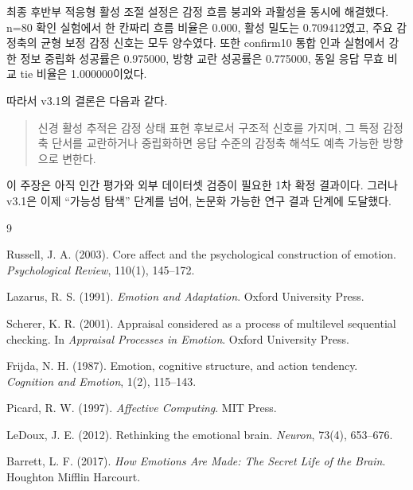 \documentclass[11pt,a4paper]{article}
\begin{document}
최종 후반부 적응형 활성 조절 설정은 감정 흐름 붕괴와 과활성을 동시에 해결했다. n=80 확인 실험에서 한 칸짜리 흐름 비율은 0.000, 활성 밀도는 0.709412였고, 주요 감정축의 균형 보정 감정 신호는 모두 양수였다. 또한 confirm10 통합 인과 실험에서 강한 정보 중립화 성공률은 0.975000, 방향 교란 성공률은 0.775000, 동일 응답 무효 비교 tie 비율은 1.000000이었다.

따라서 v3.1의 결론은 다음과 같다.

\begin{quote}
신경 활성 추적은 감정 상태 표현 후보로서 구조적 신호를 가지며, 그 특정 감정축 단서를 교란하거나 중립화하면 응답 수준의 감정축 해석도 예측 가능한 방향으로 변한다.
\end{quote}

이 주장은 아직 인간 평가와 외부 데이터셋 검증이 필요한 1차 확정 결과이다. 그러나 v3.1은 이제 ``가능성 탐색'' 단계를 넘어, 논문화 가능한 연구 결과 단계에 도달했다.

\begin{thebibliography}{9}

Russell, J. A. (2003).
Core affect and the psychological construction of emotion.
\textit{Psychological Review}, 110(1), 145--172.

Lazarus, R. S. (1991).
\textit{Emotion and Adaptation}.
Oxford University Press.

Scherer, K. R. (2001).
Appraisal considered as a process of multilevel sequential checking.
In \textit{Appraisal Processes in Emotion}.
Oxford University Press.

Frijda, N. H. (1987).
Emotion, cognitive structure, and action tendency.
\textit{Cognition and Emotion}, 1(2), 115--143.

Picard, R. W. (1997).
\textit{Affective Computing}.
MIT Press.

LeDoux, J. E. (2012).
Rethinking the emotional brain.
\textit{Neuron}, 73(4), 653--676.

Barrett, L. F. (2017).
\textit{How Emotions Are Made: The Secret Life of the Brain}.
Houghton Mifflin Harcourt.

\end{thebibliography}
\end{document}
